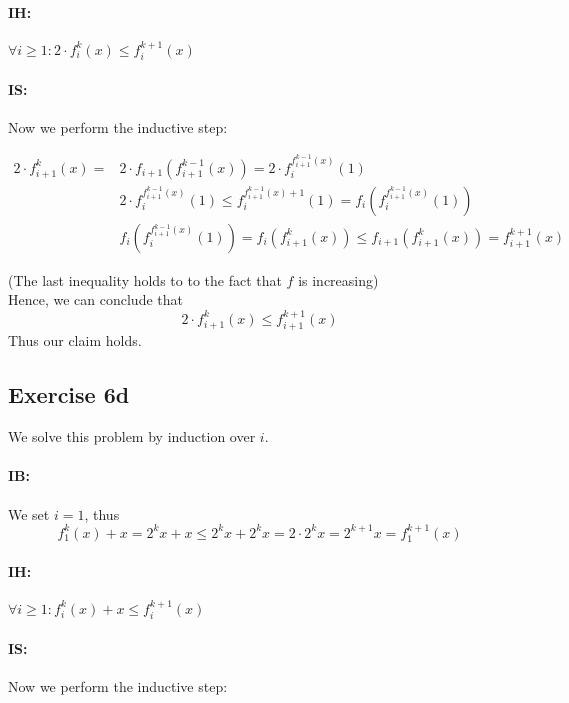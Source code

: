 \documentclass[11pt,a4paper]{article}
\begin{document}
\paragraph{IH:} $\forall i \geq 1: 2 \cdot f_i^k(x) \leq f_i^{k+1}(x) $

\paragraph{IS:} Now we perform the inductive step:

\begin{equation*}
\begin{split}
2 \cdot f_{i+1}^k(x) = & 2 \cdot f_{i+1}(f_{i+1}^{k-1}(x)) =  2 \cdot f_{i}^{f_{i+1}^{k-1}(x)}(1) \\
& 2 \cdot f_{i}^{f_{i+1}^{k-1}(x)}(1) \leq f_{i}^{f_{i+1}^{k-1}(x)+1}(1) = f_i(f_{i}^{f_{i+1}^{k-1}(x)}(1)) \\
& f_i(f_{i}^{f_{i+1}^{k-1}(x)}(1)) = f_i( f_{i+1}^k(x)) \leq f_{i+1}( f_{i+1}^k(x)) =  f_{i+1}^{k+1}(x)
\end{split}
\end{equation*}

(The last inequality holds to to the fact that $f$ is increasing) \\
Hence, we can conclude that 
\begin{equation*}
2 \cdot f_{i+1}^k(x) \leq f_{i+1}^{k+1}(x)
\end{equation*}
Thus our claim holds.


\subsection*{Exercise 6d}

We solve this problem by induction over $i$.

\paragraph{IB:} We set $i=1$, thus 
\begin{equation*}
f_1^k(x) + x  = 2^k x+x \leq 2^kx + 2^kx = 2 \cdot 2^kx =  2^{k+1}x =   f_1^{k+1}(x) 
\end{equation*}

\paragraph{IH:} $\forall i \geq 1:  f_i^k(x) + x \leq f_i^{k+1}(x) $

\paragraph{IS:} Now we perform the inductive step:
\end{document}
